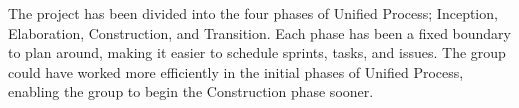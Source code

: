 The project has been divided into the four phases of Unified Process; Inception,
Elaboration, Construction, and Transition. Each phase has been a fixed boundary
to plan around, making it easier to schedule sprints, tasks, and issues. The
group could have worked more efficiently in the initial phases of Unified
Process, enabling the group to begin the Construction phase sooner.
